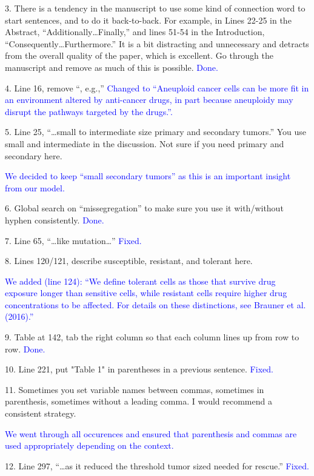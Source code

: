 \documentclass[12pt]{extarticle}
\begin{document}
3. There is a tendency in the manuscript to use some kind of connection word to start sentences, and to do it back-to-back. For example, in Lines 22-25 in the Abstract, ``Additionally\ldots Finally,'' and lines 51-54 in the Introduction, ``Consequently\ldots Furthermore.'' It is a bit distracting and unnecessary and detracts from the overall quality of the paper, which is excellent. Go through the manuscript and remove as much of this is possible.
\textcolor{blue}{Done.} %



4. Line 16, remove ``, e.g.,''
\textcolor{blue}{Changed to ``Aneuploid cancer cells can be more fit in an environment altered by anti-cancer drugs, in part because aneuploidy may disrupt the pathways  targeted by the drugs.''.} 


5. Line 25, ``\ldots small to intermediate size primary and secondary tumors.'' You use small and intermediate in the discussion. Not sure if you need primary and secondary here.

\textcolor{blue}{We decided to keep ``small secondary tumors'' as this is an important insight from our model.} 


6. Global search on ``missegregation'' to make sure you use it with/without hyphen consistently.
\textcolor{blue}{Done.}

7. Line 65, ``\dots like mutation\ldots''
\textcolor{blue}{Fixed.}


8. Lines 120/121, describe susceptible, resistant, and tolerant here.

\textcolor{blue}{We added (line 124): ``We define tolerant cells as those that survive drug exposure longer than sensitive cells, while resistant cells require higher drug concentrations to be affected. For details on these distinctions, see Brauner et al. (2016).''} %


9. Table at 142, tab the right column so that each column lines up from row to row.
\textcolor{blue}{Done.}


10. Line 221, put "Table 1" in parentheses in a previous sentence.
\textcolor{blue}{Fixed.}


11. Sometimes you set variable names between commas, sometimes in parenthesis, sometimes without a leading comma. I would recommend a consistent strategy.

\textcolor{blue}{We went through all occurences and ensured that parenthesis and commas are used appropriately depending on the context.}


12. Line 297, ``\ldots as it reduced the threshold tumor sized needed for rescue.''
\textcolor{blue}{Fixed.} %
\end{document}
